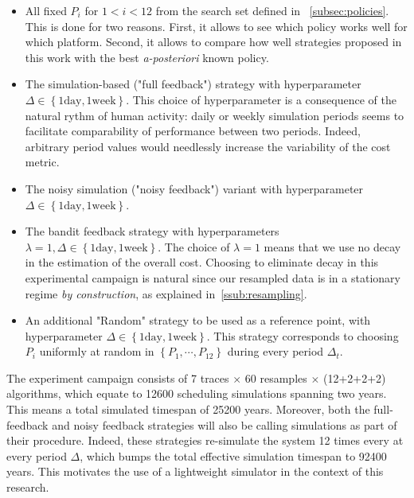 \documentclass[sigconf,anonymous]{acmart}
\begin{document}
\begin{itemize}

  \item All fixed $P_i$ for $1<i<12$ from the search set defined in
    ~\ref{subsec:policies}.  This is done for two reasons. First, it allows to
    see which policy works well for which platform. Second, it allows to
    compare how well strategies proposed in this work with the best
    \textit{a-posteriori} known policy.

  \item The simulation-based ("full feedback") strategy with hyperparameter
    $\Delta \in \left\{ 1 \text{day},1 \text{week} \right\}$. This choice of
    hyperparameter is a consequence of the natural rythm of human activity:
    daily or weekly simulation periods seems to facilitate comparability of
    performance between two periods. Indeed, arbitrary period values would
    needlessly increase the variability of the cost metric.

  \item The noisy simulation ("noisy feedback") variant with hyperparameter
    $\Delta \in \left\{ 1 \text{day},1 \text{week} \right\}$.

  \item The bandit feedback strategy with hyperparameters $\lambda=1, \Delta
    \in \left\{ 1 \text{day},1 \text{week} \right\}$. The choice of $\lambda=1$
    means that we use no decay in the estimation of the overall cost. Choosing
    to eliminate decay in this experimental campaign is natural since our
    resampled data is in a stationary regime \textit{by construction}, as
    explained in~\ref{ssub:resampling}.

  \item An additional "Random" strategy to be used as a reference point, with
    hyperparameter $ \Delta \in \left\{ 1 \text{day},1 \text{week} \right\}$.
    This strategy corresponds to choosing $P_i$ uniformly at random in $\left\{
      P_1 , \cdots, P_{12} \right\}$ during every period $\Delta_t$.

\end{itemize}

The experiment campaign consists of 7 traces $\times$ 60 resamples $\times$
(12+2+2+2) algorithms, which equate to 12600 scheduling simulations spanning
two years.  This means a total simulated timespan of 25200 years. Moreover,
both the full-feedback and noisy feedback strategies will also be calling
simulations as part of their procedure. Indeed, these strategies re-simulate
the system 12 times every at every period $\Delta$, which bumps the total
effective simulation timespan to 92400 years. This motivates the use of a
lightweight simulator in the context of this research.
\end{document}
